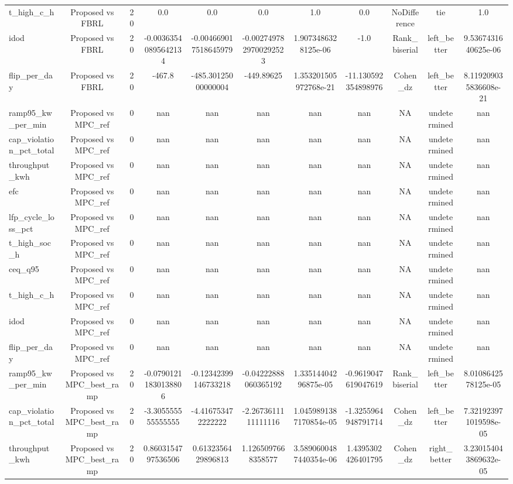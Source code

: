 \begin{table}[t]
\begin{tabular}{lcccccccccc}
t\_high\_c\_h & Proposed vs FBRL & 20 & 0.0 & 0.0 & 0.0 & 1.0 & 0.0 & NoDifference & tie & 1.0 \\
idod & Proposed vs FBRL & 20 & -0.00363540895642134 & -0.004669017518645979 & -0.0027497829700292523 & 1.9073486328125e-06 & -1.0 & Rank\_biserial & left\_better & 9.5367431640625e-06 \\
flip\_per\_day & Proposed vs FBRL & 20 & -467.8 & -485.30125000000004 & -449.89625 & 1.353201505972768e-21 & -11.130592354898976 & Cohen\_dz & left\_better & 8.119209035836608e-21 \\
ramp95\_kw\_per\_min & Proposed vs MPC\_ref & 0 & nan & nan & nan & nan & nan & NA & undetermined & nan \\
cap\_violation\_pct\_total & Proposed vs MPC\_ref & 0 & nan & nan & nan & nan & nan & NA & undetermined & nan \\
throughput\_kwh & Proposed vs MPC\_ref & 0 & nan & nan & nan & nan & nan & NA & undetermined & nan \\
efc & Proposed vs MPC\_ref & 0 & nan & nan & nan & nan & nan & NA & undetermined & nan \\
lfp\_cycle\_loss\_pct & Proposed vs MPC\_ref & 0 & nan & nan & nan & nan & nan & NA & undetermined & nan \\
t\_high\_soc\_h & Proposed vs MPC\_ref & 0 & nan & nan & nan & nan & nan & NA & undetermined & nan \\
ceq\_q95 & Proposed vs MPC\_ref & 0 & nan & nan & nan & nan & nan & NA & undetermined & nan \\
t\_high\_c\_h & Proposed vs MPC\_ref & 0 & nan & nan & nan & nan & nan & NA & undetermined & nan \\
idod & Proposed vs MPC\_ref & 0 & nan & nan & nan & nan & nan & NA & undetermined & nan \\
flip\_per\_day & Proposed vs MPC\_ref & 0 & nan & nan & nan & nan & nan & NA & undetermined & nan \\
ramp95\_kw\_per\_min & Proposed vs MPC\_best\_ramp & 20 & -0.07901211830138806 & -0.12342399146733218 & -0.04222888060365192 & 1.33514404296875e-05 & -0.9619047619047619 & Rank\_biserial & left\_better & 8.0108642578125e-05 \\
cap\_violation\_pct\_total & Proposed vs MPC\_best\_ramp & 20 & -3.305555555555555 & -4.416753472222222 & -2.2673611111111116 & 1.0459891387170854e-05 & -1.3255964948791714 & Cohen\_dz & left\_better & 7.321923971019598e-05 \\
throughput\_kwh & Proposed vs MPC\_best\_ramp & 20 & 0.8603154797536506 & 0.6132356429896813 & 1.1265097668358577 & 3.5890600487440354e-06 & 1.4395302426401795 & Cohen\_dz & right\_better & 3.230154043869632e-05 \\

\end{tabular}
\end{table}
